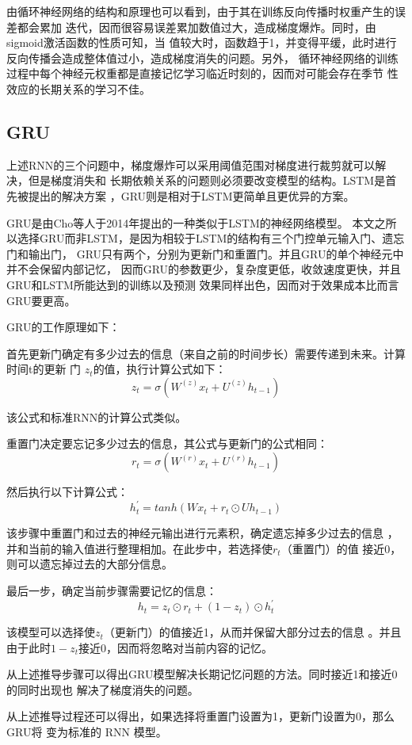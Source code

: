\documentclass[AutoFakeBold]{LZUThesis}
\begin{document}
由循环神经网络的结构和原理也可以看到，由于其在训练反向传播时权重产生的误差都会累加
迭代，因而很容易误差累加数值过大，造成梯度爆炸。同时，由sigmoid激活函数的性质可知，当
值较大时，函数趋于1，并变得平缓，此时进行反向传播会造成整体值过小，造成梯度消失的问题。另外，
循环神经网络的训练过程中每个神经元权重都是直接记忆学习临近时刻的，因而对可能会存在季节
性效应的长期关系的学习不佳。

\subsection{GRU}
上述RNN的三个问题中，梯度爆炸可以采用阈值范围对梯度进行裁剪就可以解决，但是梯度消失和
长期依赖关系的问题则必须要改变模型的结构。LSTM是首先被提出的解决方案
\cite{hochreiter1997long}，GRU则是相对于LSTM更简单且更优异的方案。

GRU是由Cho等人于2014年提出的一种类似于LSTM的神经网络模型\cite{cho2014learning}。
本文之所以选择GRU而非LSTM，是因为相较于LSTM的结构有三个门控单元输入门、遗忘门和输出门，
GRU只有两个，分别为更新门和重置门。并且GRU的单个神经元中并不会保留内部记忆，
因而GRU的参数更少，复杂度更低，收敛速度更快，并且GRU和LSTM所能达到的训练以及预测
效果同样出色，因而对于效果成本比而言GRU要更高\cite{chung2014empirical}。

GRU的工作原理如下：

首先更新门确定有多少过去的信息（来自之前的时间步长）需要传递到未来。计算时间t的更新
门 $z_t$的值，执行计算公式如下：
$$z_t=\sigma(W^{(z)}x_t+U^{(z)}h_{t-1})$$

该公式和标准RNN的计算公式类似。

重置门决定要忘记多少过去的信息，其公式与更新门的公式相同：
$$r_t=\sigma(W^{(r)}x_t+U^{(r)}h_{t-1})$$

然后执行以下计算公式：
$$h^{\prime}_t=tanh(Wx_t+r_t\odot Uh_{t-1})$$

该步骤中重置门和过去的神经元输出进行元素积，确定遗忘掉多少过去的信息
，并和当前的输入值进行整理相加。在此步中，若选择使$r_t$（重置门）的值
接近0，则可以遗忘掉过去的大部分信息。

最后一步，确定当前步骤需要记忆的信息：
$$h_t=z_t\odot r_t+(1-z_t)\odot h^{\prime}_t$$

该模型可以选择使$z_t$（更新门）的值接近1，从而并保留大部分过去的信息
。并且由于此时$1-z_t$接近0，因而将忽略对当前内容的记忆。

从上述推导步骤可以得出GRU模型解决长期记忆问题的方法。同时接近1和接近0的同时出现也
解决了梯度消失的问题。

从上述推导过程还可以得出，如果选择将重置门设置为1，更新门设置为0，那么GRU将
变为标准的 RNN 模型。
\end{document}
